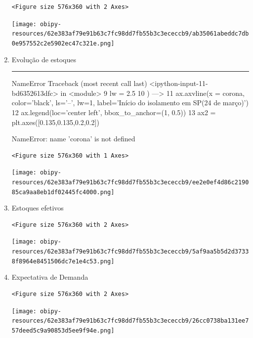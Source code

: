 \documentclass[11pt]{article}
\begin{document}
\begin{enumerate}
\begin{verbatim}
<Figure size 576x360 with 2 Axes>
\end{verbatim}


\begin{center}
\texttt{[image: obipy-resources/62e383af79e91b63c7fc98dd7fb55b3c3ececcb9/ab35061abeddc7db0e957552c2e5902ec47c321e.png]}
\end{center}

\item Evolução de estoques
\label{sec:orgdabc316}

\noindent\rule{\textwidth}{0.5pt}
NameError                                 Traceback (most recent call last)
<ipython-input-11-bd6352613dfc> in <module>
      9     lw = 2.5
     10 )
---> 11 ax.axvline(x = corona, color='black', ls='--', lw=1, label='Início do isolamento em SP\n(24 de março)')
     12 ax.legend(loc='center left', bbox\_to\_anchor=(1, 0.5))
     13 ax2 = plt.axes([0.135,0.135,0.2,0.2])

NameError: name 'corona' is not defined

\begin{verbatim}
<Figure size 576x360 with 1 Axes>
\end{verbatim}


\begin{center}
\texttt{[image: obipy-resources/62e383af79e91b63c7fc98dd7fb55b3c3ececcb9/ee2e0ef4d86c219085ca9aa8eb1df02445fc4000.png]}
\end{center}

\item Estoques efetivos
\label{sec:org0ba75a3}

\begin{verbatim}
<Figure size 576x360 with 2 Axes>
\end{verbatim}


\begin{center}
\texttt{[image: obipy-resources/62e383af79e91b63c7fc98dd7fb55b3c3ececcb9/5af9aa5b5d2d37338f8964e8451506dc7e1e4c53.png]}
\end{center}

\item Expectativa de Demanda
\label{sec:orgc8f0683}

\begin{verbatim}
<Figure size 576x360 with 2 Axes>
\end{verbatim}


\begin{center}
\texttt{[image: obipy-resources/62e383af79e91b63c7fc98dd7fb55b3c3ececcb9/26cc0738ba131ee757deed5c9a90853d5ee9f94e.png]}
\end{center}


\end{enumerate}
\end{document}
